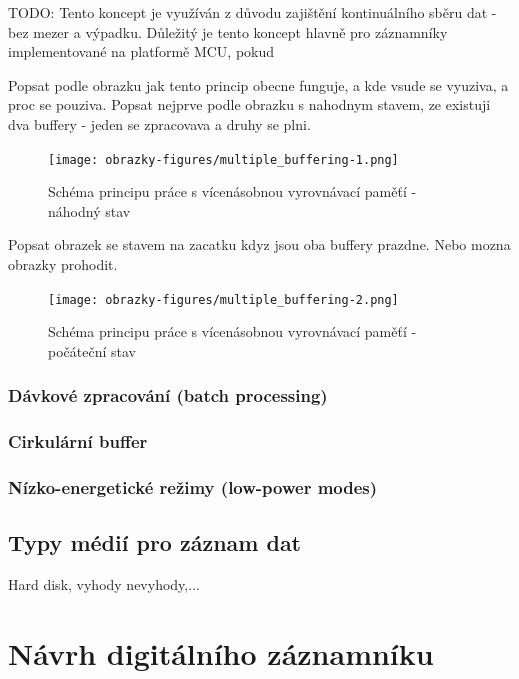 TODO: Tento koncept je využíván z důvodu zajištění kontinuálního sběru dat - bez mezer a výpadku. Důležitý je tento koncept hlavně pro záznamníky 
implementované na platformě MCU, pokud

Popsat podle obrazku jak tento princip obecne funguje, a kde vsude se vyuziva, a proc se pouziva. Popsat nejprve podle obrazku s nahodnym stavem, ze existuji 
dva buffery - jeden se zpracovava a druhy se plni.

\begin{figure}[h] %
    \centering
    \texttt{[image: obrazky-figures/multiple\_buffering-1.png]}
    
    \caption{Schéma principu práce s vícenásobnou vyrovnávací paměťí - náhodný stav}
    \label{fig:multiple-buffering-1}
\end{figure}

Popsat obrazek se stavem na zacatku kdyz jsou oba buffery prazdne. Nebo mozna obrazky prohodit.

\begin{figure}[h] %
    \centering
    \texttt{[image: obrazky-figures/multiple\_buffering-2.png]}
    
    \caption{Schéma principu práce s vícenásobnou vyrovnávací paměťí - počáteční stav}
    \label{fig:multiple-buffering-2}
\end{figure}

\subsection{Dávkové zpracování (batch processing)}

\subsection{Cirkulární buffer}

\subsection{Nízko-energetické režimy (low-power modes)}

\section{Typy médií pro záznam dat}
Hard disk, vyhody nevyhody,... 

\chapter{Návrh digitálního záznamníku}

